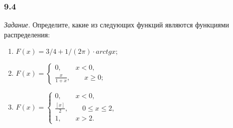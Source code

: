 \subsubsection*{9.4}

\textit{Задание.} Определите, какие из следующих функций являются функциями распределения:
\begin{enumerate}[label=\alph*)]
\item $F \left( x \right) = 3/4 + 1/ \left( 2 \pi \right) \cdot arctg x $;
\item $F \left( x \right) =
\begin{cases}
0, \qquad x < 0, \\
\frac{x}{1+x}, \qquad x \geq 0;
\end{cases}$
\item $F \left( x \right) =
\begin{cases}
0, \qquad x < 0, \\
\frac{ \left[ x \right] }{2}, \qquad 0 \leq x \leq 2, \\
1, \qquad x > 2.
\end{cases}$
\end{enumerate}

